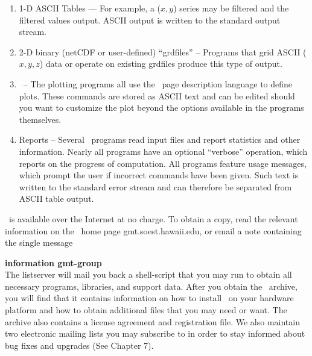 \begin{enumerate}

\item{1-D ASCII Tables --- For example, a ($x,y$) series may be filtered and
the filtered values output.  ASCII output is written to the standard output stream.} 

\item{2-D binary (netCDF or user-defined) ``grdfiles'' -- Programs that grid
ASCII ($x,y,z$) data or operate on existing grdfiles produce this type of output.} 

\item{\PS\ -- The plotting programs all use the \PS\
page description language to define plots.  These commands are stored as ASCII
text and can be edited should you want to customize the plot beyond the options
available in the programs themselves.} 

\item{Reports -- Several \GMT\ programs read input files and report statistics
and other information.  Nearly all programs have an optional ``verbose''
operation, which reports on the progress of computation.  All programs feature
usage messages, which prompt the user if incorrect commands have been given.
Such text is written to the standard error stream and can therefore be
separated from ASCII table output.} 

\end{enumerate} 

\GMT\ is available over the Internet at no charge.  To obtain a copy, read
the relevant information on the \GMT\ home page gmt.soest.hawaii.edu,
or email
a note containing the single message \\ 

\textbf{information gmt-group} \\

The listserver will mail you back a shell-script that you may run to obtain
all necessary programs, libraries, and support data.  After you obtain the
\GMT\ archive, you will find that it contains information on how to install
\GMT\ on your hardware platform and how to obtain additional files that you
may need or want.  The archive also contains a license agreement and
registration file.  We also maintain two electronic mailing lists you may
subscribe to in order to stay informed about bug fixes and upgrades (See
Chapter 7).

